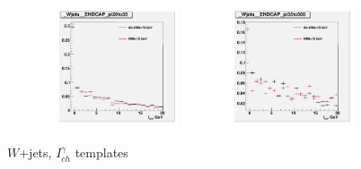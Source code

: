 \begin{figure}[htb]
\begin{center}
  \includegraphics[width=0.45\textwidth]{../figs/figs_v11/ChannelsMERGED_WGamma/QuickChecks/cTemplatesVsWMt_Wjets_phoPFChIsoCorr_ENDCAP_pt20to35.pdf} \includegraphics[width=0.45\textwidth]{../figs/figs_v11/ChannelsMERGED_WGamma/QuickChecks/cTemplatesVsWMt_Wjets_phoPFChIsoCorr_ENDCAP_pt35to500.pdf}\\
  \caption{$W$+jets, $I_{ch}^{\gamma}$ templates}
  \label{fig:templatesVsWMt_Wjets_CHISO}
  \end{center}
\end{figure}

